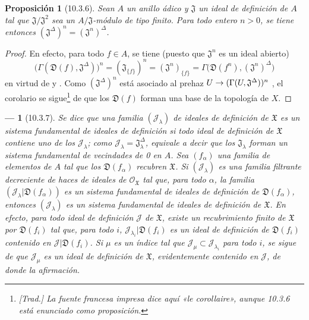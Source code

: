 \documentclass[oneside]{amsart}
\theoremstyle{ega-env-style}
\newtheorem*{env}{---}
\theoremstyle{ega-thm-env-style}
\newtheorem*{proposition}{Proposición}
\theoremstyle{ega-defn-env-style}
\renewcommand{\to}{\mathchoice{\longrightarrow}{\rightarrow}{\rightarrow}{\rightarrow}}
\newcommand{\oldpage}[2][]{{\marginnote{\normalfont{\textbf{#1}~|~#2}}}\ignorespaces}
\let\EGAOriginalLabel\label
\renewcommand{\label}[1]{\phantomsection\EGAOriginalLabel{#1}}
\begin{document}
\begin{proposition}[10.3.6]
\label{I.10.3.6}
Sean $A$ un anillo ádico y $\mathfrak{J}$ un ideal de definición de $A$ tal que $\mathfrak{J}/\mathfrak{J}^2$ sea un $A/\mathfrak{J}$-módulo de tipo finito. Para todo entero $n>0$, se tiene entonces $(\mathfrak{J}^\Delta)^n=(\mathfrak{J}^n)^\Delta$.
\end{proposition}

\begin{proof}
En efecto, para todo $f\in A$, se tiene (puesto que $\mathfrak{J}^n$ es un ideal abierto)
\[
  \bigl(\Gamma(\mathfrak{D}(f),\mathfrak{J}^\Delta)\bigr)^n
  =(\mathfrak{J}_{\{f\}})^n
  =(\mathfrak{J}^n)_{\{f\}}
  =\Gamma\bigl(\mathfrak{D}(f^n),(\mathfrak{J}^n)^\Delta\bigr)
\]
\oldpage[I]{185}
en virtud de  y .
Como $(\mathfrak{J}^\Delta)^n$ está asociado al prehaz $U\to(\Gamma(U,\mathfrak{J}^\Delta))^n$ , el corolario se sigue\footnote{\emph{[Trad.] La fuente francesa impresa dice aquí «le corollaire», aunque 10.3.6 está enunciado como proposición.}} de que los $\mathfrak{D}(f)$ forman una base de la topología de $X$.
\end{proof}

\begin{env}[10.3.7]
\label{I.10.3.7}
Se dice que una familia $(\mathscr{J}_\lambda)$ de ideales de definición de $\mathfrak{X}$ es un \emph{sistema fundamental de ideales de definición} si todo ideal de definición de $\mathfrak{X}$ contiene uno de los $\mathscr{J}_\lambda$; como $\mathscr{J}_\lambda=\mathfrak{J}_\lambda^\Delta$, equivale a decir que los $\mathfrak{J}_\lambda$ forman un \emph{sistema fundamental de vecindades de} 0 en $A$.
Sea $(f_\alpha)$ una familia de elementos de $A$ tal que los $\mathfrak{D}(f_\alpha)$ recubren $\mathfrak{X}$.
Si $(\mathscr{J}_\lambda)$ es una familia filtrante decreciente de haces de ideales de $\mathscr{O}_{\mathfrak{X}}$ tal que, para todo $\alpha$, la familia $(\mathscr{J}_\lambda|\mathfrak{D}(f_\alpha))$ es un sistema fundamental de ideales de definición de $\mathfrak{D}(f_\alpha)$, entonces $(\mathscr{J}_\lambda)$ es un sistema fundamental de ideales de definición de $\mathfrak{X}$.
En efecto, para todo ideal de definición $\mathscr{J}$ de $\mathfrak{X}$, existe un recubrimiento finito de $\mathfrak{X}$ por $\mathfrak{D}(f_i)$ tal que, para todo $i$, $\mathscr{J}_{\lambda_i}|\mathfrak{D}(f_i)$ es un ideal de definición de $\mathfrak{D}(f_i)$ contenido en $\mathscr{J}|\mathfrak{D}(f_i)$.
Si $\mu$ es un índice tal que $\mathscr{J}_\mu\subset\mathscr{J}_{\lambda_i}$ para todo $i$, se sigue de  que $\mathscr{J}_\mu$ es un ideal de definición de $\mathfrak{X}$, evidentemente contenido en $\mathscr{J}$, de donde la afirmación.
\end{env}
\end{document}
